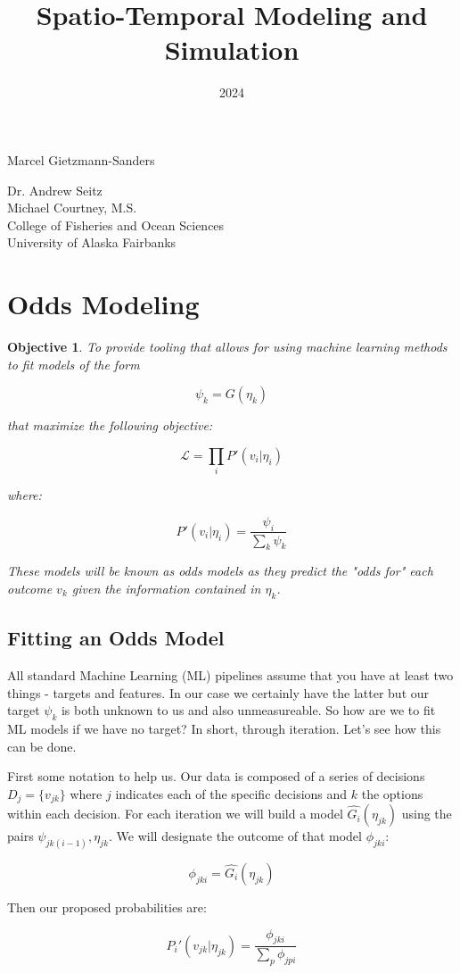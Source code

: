 \documentclass[11pt]{article}
\title{Spatio-Temporal Modeling and Simulation}
\date{2024}
\makeatletter
\newtheorem{objective}{Objective}
\renewcommand{\maketitle}{
\begin{center}

\pagestyle{empty}
\phantom{.}  %
\vspace{3cm}

{\Huge \bf \@title\par}
\vspace{2.5cm}

{\LARGE Marcel Gietzmann-Sanders}\\[1cm]

{\Large\@date}

\vspace{2.5cm}
{\Large Dr. Andrew Seitz}\hspace{2cm}{\Large Dr. Curry Cunningham}\\[2cm]{\Large Michael Courtney, M.S.}\\[2cm]
College of Fisheries and Ocean Sciences\\
University of Alaska Fairbanks


\end{center}
}\makeatother
\makeatother
\begin{document}
\maketitle
\newpage
\tableofcontents
\newpage

\section{Odds Modeling}

\begin{objective}
To provide tooling that allows for using machine learning methods to fit models of the form

$$\psi_k = G(\eta_k)$$

that maximize the following objective:


$$\mathcal{L}=\prod_i P'(v_i | \eta_i)$$

where:

$$P'(v_i|\eta_i) = \frac{\psi_i}{\sum_k \psi_k}$$

These models will be known as odds models as they predict the "odds for" each outcome $v_k$ given the information contained in $\eta_k$. 

\end{objective}

\subsection{Fitting an Odds Model}

All standard Machine Learning (ML) pipelines assume that you have at least two things - targets and features. In our case we certainly have the latter but our target $\psi_k$ is both unknown to us and also unmeasureable. So how are we to fit ML models if we have no target? In short, through iteration. Let's see how this can be done.\newline

First some notation to help us. Our data is composed of a series of decisions $D_j=\lbrace v_{jk} \rbrace$ where $j$ indicates each of the specific decisions and $k$ the options within each decision. For each iteration we will build a model $\hat{G_i}(\eta_{jk})$ using the pairs $\psi_{jk(i-1)},\eta_{jk}$. We will designate the outcome of that model $\phi_{jki}$:

$$\phi_{jki} = \hat{G_i}(\eta_{jk})$$

Then our proposed probabilities are:

$$P_i'(v_{jk}|\eta_{jk})=\frac{\phi_{jki}}{\sum_p \phi_{jpi}}$$
\end{document}
